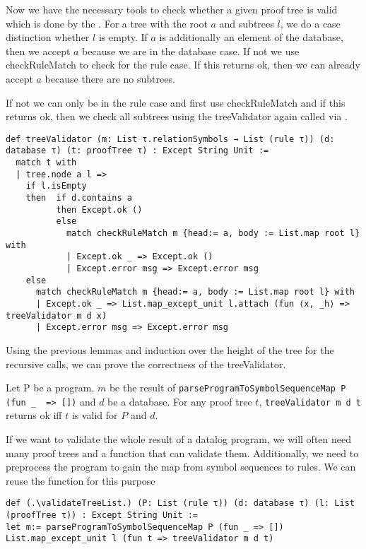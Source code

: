Now we have the necessary tools to check whether a given proof tree is valid which is done by the \treeValidator. For a tree with the root $a$ and subtrees $l$, we do a case distinction whether $l$ is empty. If $a$ is additionally an element of the database, then we accept $a$ because we are in the database case. If not we use checkRuleMatch to check for the rule case. If this returns ok, then we can already accept $a$ because there are no subtrees.

If not we can only be in the rule case and first use checkRuleMatch and if this returns ok, then we check all subtrees using the treeValidator again called via \Listmapexceptunit.

\begin{lstlisting}
def treeValidator (m: List τ.relationSymbols → List (rule τ)) (d: database τ) (t: proofTree τ) : Except String Unit :=
  match t with
  | tree.node a l =>
    if l.isEmpty
    then  if d.contains a
          then Except.ok ()
          else
            match checkRuleMatch m {head:= a, body := List.map root l} with
            | Except.ok _ => Except.ok ()
            | Except.error msg => Except.error msg
    else
      match checkRuleMatch m {head:= a, body := List.map root l} with
      | Except.ok _ => List.map_except_unit l.attach (fun ⟨x, _h⟩ => treeValidator m d x)
      | Except.error msg => Except.error msg
\end{lstlisting}

Using the previous lemmas and induction over the height of the tree for the recursive calls, we can prove the correctness of the treeValidator.

\begin{theorem}[\treeValidatorOkIffIsValid]\label{trm:treeValidator}
    Let P be a program, $m$ be the result of \lstinline|parseProgramToSymbolSequenceMap P (fun _  => [])| and $d$ be a database. For any proof tree $t$, \lstinline|treeValidator m d t| returns ok iff $t$ is valid for $P$ and $d$.
\end{theorem}


If we want to validate the whole result of a datalog program, we will often need many proof trees and a function that can validate them. Additionally, we need to preprocess the program to gain the map from symbol sequences to rules. We can reuse the \Listmapexceptunit function for this purpose

\begin{lstlisting}
def (.\validateTreeList.) (P: List (rule τ)) (d: database τ) (l: List (proofTree τ)) : Except String Unit :=
let m:= parseProgramToSymbolSequenceMap P (fun _ => [])
List.map_except_unit l (fun t => treeValidator m d t)
\end{lstlisting}

